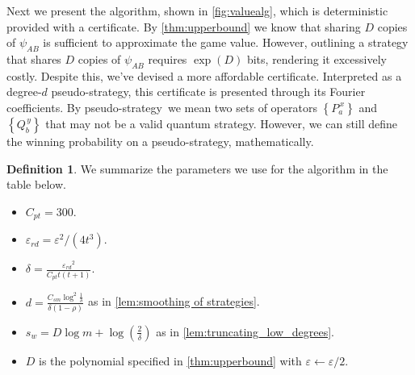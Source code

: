 \documentclass[10pt,a4paper]{article}
\theoremstyle{plain}
\theoremstyle{definition}
\newtheorem{definition}[theorem]{Definition}
\newcommand {\set} [1] {\ensuremath{ \left\lbrace #1 \right\rbrace }}
\newcommand {\br} [1] {\ensuremath{ \left( #1 \right) }}
\newcommand{\ep} {\ensuremath{\varepsilon}}
\newcommand{\ccsm} {\ensuremath{C_{sm}}}
\newcommand{\dmcc} {\ensuremath{C_{pt}}}
\newcommand{\dlbo} {\ensuremath{{D}}}
\newcommand{\dldd} {\ensuremath{{d}}}
\newcommand{\wireal} {\ensuremath{{s_{w}}}}
\newcommand{\eprd} {\ensuremath{\ep_{rd}}}
\newcommand{\pseudostrategy} {pseudo-strategy}
\newcommand{\Pss} {\ensuremath{P^{\,x}_a}}
\newcommand{\Qss} {\ensuremath{Q^{\,y}_b}}
\newcommand{\1}{\mathbb{1}} %
\begin{document}
Next we present the algorithm, shown in \cref{fig:valuealg}, which is deterministic provided with a certificate. 
By \cref{thm:upperbound} we know that sharing $\dlbo$ copies of $\psi_{AB}$ is sufficient to approximate the game value. However, outlining a strategy that shares $\dlbo$ copies of $\psi_{AB}$ requires $\exp\br{\dlbo}$ bits, rendering it excessively costly. Despite this, we've devised a more affordable certificate. Interpreted as a degree-$\dldd$ \pseudostrategy, this certificate is presented through its Fourier coefficients. By \pseudostrategy\ we mean two sets of operators $\set{\Pss}$ and $\set{\Qss}$ that may not be a valid quantum strategy. However, we can still define the winning probability on a 
\pseudostrategy, mathematically.

\begin{definition}\label{def:params-np}
We summarize the parameters we use for the algorithm in the table below.
\begin{itemize}
  \item $\dmcc=300$.
  \item $\eprd=\ep^2/(4t^3)$.
  \item $\delta = \frac{\eprd^2}{\dmcc t(t+1)}$.
  \item $\dldd=\frac{\ccsm\log^2\frac{1}{\delta}}{\delta(1-\rho)}$ as in \cref{lem:smoothing of strategies}.
  \item $\wireal = D\log m + \log\br{\frac{2}{\delta}}$ as in \cref{lem:truncating_low_degrees}.
  \item $\dlbo$ is the polynomial specified in \cref{thm:upperbound} with $\ep\gets\ep/2$.
\end{itemize}
\end{definition}
\end{document}
